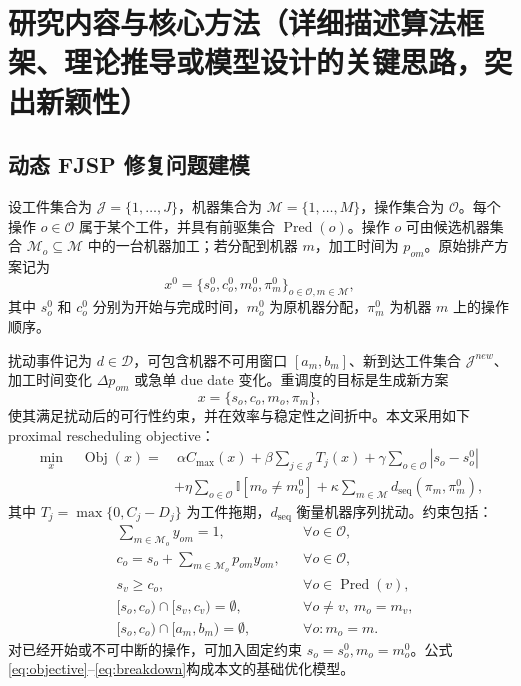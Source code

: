 \documentclass[UTF8,12pt,a4paper]{ctexart}
\newcommand{\obj}{\operatorname{Obj}}
\newcommand{\J}{\mathcal{J}}
\newcommand{\M}{\mathcal{M}}
\newcommand{\Oset}{\mathcal{O}}
\begin{document}
\section{研究内容与核心方法（详细描述算法框架、理论推导或模型设计的关键思路，突出新颖性）}

\subsection{动态 FJSP 修复问题建模}

设工件集合为 $\J=\{1,\dots,J\}$，机器集合为 $\M=\{1,\dots,M\}$，操作集合为 $\Oset$。每个操作 $o\in\Oset$ 属于某个工件，并具有前驱集合 $\operatorname{Pred}(o)$。操作 $o$ 可由候选机器集合 $\M_o\subseteq\M$ 中的一台机器加工；若分配到机器 $m$，加工时间为 $p_{om}$。原始排产方案记为
\begin{equation}
    x^0 = \{s_o^0, c_o^0, m_o^0, \pi_m^0\}_{o\in\Oset,m\in\M},
\end{equation}
其中 $s_o^0$ 和 $c_o^0$ 分别为开始与完成时间，$m_o^0$ 为原机器分配，$\pi_m^0$ 为机器 $m$ 上的操作顺序。

扰动事件记为 $d\in\mathcal{D}$，可包含机器不可用窗口 $[a_m,b_m]$、新到达工件集合 $\J^{new}$、加工时间变化 $\Delta p_{om}$ 或急单 due date 变化。重调度的目标是生成新方案
\begin{equation}
    x = \{s_o,c_o,m_o,\pi_m\},
\end{equation}
使其满足扰动后的可行性约束，并在效率与稳定性之间折中。本文采用如下 proximal rescheduling objective：
\begin{equation}
\label{eq:objective}
\begin{aligned}
    \min_x \quad \obj(x) =
    &\ \alpha C_{\max}(x)
    + \beta \sum_{j\in\J} T_j(x)
    + \gamma \sum_{o\in\Oset} |s_o-s_o^0| \\
    &+ \eta \sum_{o\in\Oset} \mathbb{I}[m_o\neq m_o^0]
    + \kappa \sum_{m\in\M} d_{\mathrm{seq}}(\pi_m,\pi_m^0),
\end{aligned}
\end{equation}
其中 $T_j=\max\{0,C_j-D_j\}$ 为工件拖期，$d_{\mathrm{seq}}$ 衡量机器序列扰动。约束包括：
\begin{align}
    &\sum_{m\in\M_o} y_{om}=1, &&\forall o\in\Oset, \label{eq:assign}\\
    &c_o=s_o+\sum_{m\in\M_o}p_{om}y_{om}, &&\forall o\in\Oset, \label{eq:completion}\\
    &s_v\geq c_o, &&\forall o\in\operatorname{Pred}(v), \label{eq:precedence}\\
    &[s_o,c_o)\cap[s_v,c_v)=\emptyset, &&\forall o\neq v,\ m_o=m_v, \label{eq:nooverlap}\\
    &[s_o,c_o)\cap [a_m,b_m)=\emptyset, &&\forall o: m_o=m. \label{eq:breakdown}
\end{align}
对已经开始或不可中断的操作，可加入固定约束 $s_o=s_o^0,m_o=m_o^0$。公式\eqref{eq:objective}--\eqref{eq:breakdown}构成本文的基础优化模型。
\end{document}
